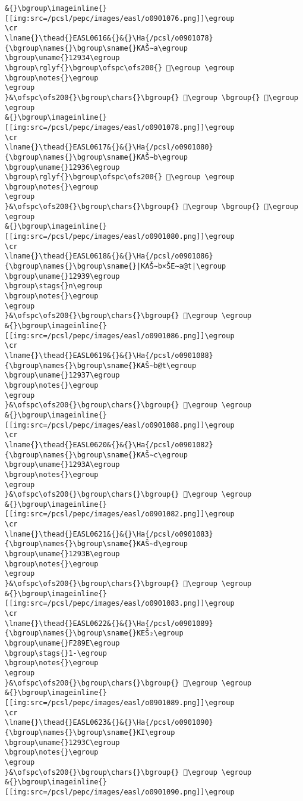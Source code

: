 \begin{verbatim}
&{}\bgroup\imageinline{}[[img:src=/pcsl/pepc/images/easl/o0901076.png]]\egroup
\cr
\lname{}\thead{}EASL0616&{}&{}\Ha{/pcsl/o0901078}{\bgroup\names{}\bgroup\sname{}KAŠ∼a\egroup
\bgroup\uname{}12934\egroup
\bgroup\rglyf{}\bgroup\ofspc\ofs200{} 𒤴\egroup \egroup
\bgroup\notes{}\egroup
\egroup
}&\ofspc\ofs200{}\bgroup\chars{}\bgroup{} 𒤵\egroup \bgroup{} 𒤴\egroup \egroup
&{}\bgroup\imageinline{}[[img:src=/pcsl/pepc/images/easl/o0901078.png]]\egroup
\cr
\lname{}\thead{}EASL0617&{}&{}\Ha{/pcsl/o0901080}{\bgroup\names{}\bgroup\sname{}KAŠ∼b\egroup
\bgroup\uname{}12936\egroup
\bgroup\rglyf{}\bgroup\ofspc\ofs200{} 𒤶\egroup \egroup
\bgroup\notes{}\egroup
\egroup
}&\ofspc\ofs200{}\bgroup\chars{}\bgroup{} 𒤸\egroup \bgroup{} 𒤶\egroup \egroup
&{}\bgroup\imageinline{}[[img:src=/pcsl/pepc/images/easl/o0901080.png]]\egroup
\cr
\lname{}\thead{}EASL0618&{}&{}\Ha{/pcsl/o0901086}{\bgroup\names{}\bgroup\sname{}|KAŠ∼b×ŠE∼a@t|\egroup
\bgroup\uname{}12939\egroup
\bgroup\stags{}n\egroup
\bgroup\notes{}\egroup
\egroup
}&\ofspc\ofs200{}\bgroup\chars{}\bgroup{} 𒤹\egroup \egroup
&{}\bgroup\imageinline{}[[img:src=/pcsl/pepc/images/easl/o0901086.png]]\egroup
\cr
\lname{}\thead{}EASL0619&{}&{}\Ha{/pcsl/o0901088}{\bgroup\names{}\bgroup\sname{}KAŠ∼b@t\egroup
\bgroup\uname{}12937\egroup
\bgroup\notes{}\egroup
\egroup
}&\ofspc\ofs200{}\bgroup\chars{}\bgroup{} 𒤷\egroup \egroup
&{}\bgroup\imageinline{}[[img:src=/pcsl/pepc/images/easl/o0901088.png]]\egroup
\cr
\lname{}\thead{}EASL0620&{}&{}\Ha{/pcsl/o0901082}{\bgroup\names{}\bgroup\sname{}KAŠ∼c\egroup
\bgroup\uname{}1293A\egroup
\bgroup\notes{}\egroup
\egroup
}&\ofspc\ofs200{}\bgroup\chars{}\bgroup{} 𒤺\egroup \egroup
&{}\bgroup\imageinline{}[[img:src=/pcsl/pepc/images/easl/o0901082.png]]\egroup
\cr
\lname{}\thead{}EASL0621&{}&{}\Ha{/pcsl/o0901083}{\bgroup\names{}\bgroup\sname{}KAŠ∼d\egroup
\bgroup\uname{}1293B\egroup
\bgroup\notes{}\egroup
\egroup
}&\ofspc\ofs200{}\bgroup\chars{}\bgroup{} 𒤻\egroup \egroup
&{}\bgroup\imageinline{}[[img:src=/pcsl/pepc/images/easl/o0901083.png]]\egroup
\cr
\lname{}\thead{}EASL0622&{}&{}\Ha{/pcsl/o0901089}{\bgroup\names{}\bgroup\sname{}KEŠ₂\egroup
\bgroup\uname{}F289E\egroup
\bgroup\stags{}1-\egroup
\bgroup\notes{}\egroup
\egroup
}&\ofspc\ofs200{}\bgroup\chars{}\bgroup{} 󲢞\egroup \egroup
&{}\bgroup\imageinline{}[[img:src=/pcsl/pepc/images/easl/o0901089.png]]\egroup
\cr
\lname{}\thead{}EASL0623&{}&{}\Ha{/pcsl/o0901090}{\bgroup\names{}\bgroup\sname{}KI\egroup
\bgroup\uname{}1293C\egroup
\bgroup\notes{}\egroup
\egroup
}&\ofspc\ofs200{}\bgroup\chars{}\bgroup{} 𒤼\egroup \egroup
&{}\bgroup\imageinline{}[[img:src=/pcsl/pepc/images/easl/o0901090.png]]\egroup

\end{verbatim}
